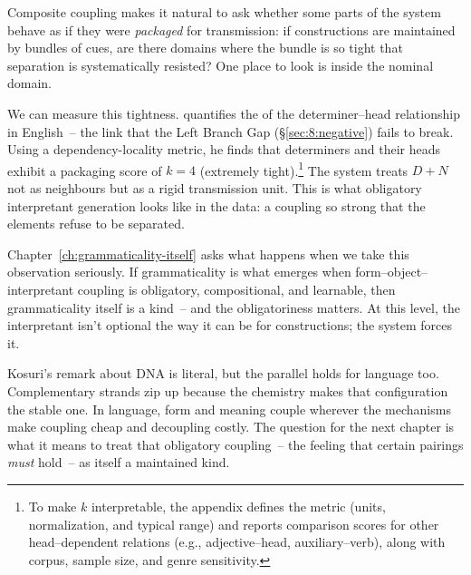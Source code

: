 Composite coupling makes it natural to ask whether some parts of the system behave as if they were \emph{packaged} for transmission: if constructions are maintained by bundles of cues, are there domains where the bundle is so tight that separation is systematically resisted? One place to look is inside the nominal domain.

We can measure this tightness. \textcite{reynolds2026lbe} quantifies the  of the determiner--head relationship in English~-- the link that the Left Branch Gap (§\ref{sec:8:negative}) fails to break. Using a dependency-locality metric, he finds that determiners and their heads exhibit a packaging score of $k=4$ (extremely tight).\footnote{To make $k$ interpretable, the appendix defines the metric (units, normalization, and typical range) and reports comparison scores for other head--dependent relations (e.g., adjective--head, auxiliary--verb), along with corpus, sample size, and genre sensitivity.}
The system treats $D+N$ not as neighbours but as a rigid transmission unit. This is what obligatory interpretant generation looks like in the data: a coupling so strong that the elements refuse to be separated.

Chapter~\ref{ch:grammaticality-itself} asks what happens when we take this observation seriously. If grammaticality is what emerges when form--object--interpretant coupling is obligatory, compositional, and learnable, then grammaticality itself is a kind~-- and the obligatoriness matters. At this level, the interpretant isn't optional the way it can be for constructions; the system forces it.

Kosuri's remark about DNA is literal, but the parallel holds for language too. Complementary strands zip up because the chemistry makes that configuration the stable one. In language, form and meaning couple wherever the mechanisms make coupling cheap and decoupling costly. The question for the next chapter is what it means to treat that obligatory coupling~-- the feeling that certain pairings \emph{must} hold~-- as itself a maintained kind.
